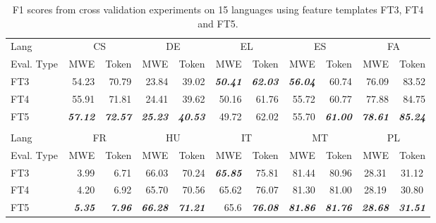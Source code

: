 \documentclass[output=paper,modfonts,nonflat]{langsci/langscibook}
\begin{document}
\begin{table}
\caption{\label{tbl:crf-cv}F1 scores from cross validation experiments on
15 languages using feature templates FT3, FT4 and FT5.}
{
\setlength{\tabcolsep}{0.5pt} %
\small
\begin{tabular}{lrrrrrrrrrr}
\lsptoprule
{Lang} & \multicolumn{2}{c}{{CS}} & \multicolumn{2}{c}{{DE}} & \multicolumn{2}{c}{{EL}} & \multicolumn{2}{c}{{ES}} & \multicolumn{2}{c}{{FA}}\tabularnewline
 
 
{Eval. Type} & {MWE} & {Token} & {MWE} & {Token} & {MWE} & {Token} & {MWE} & {Token} & {MWE} & {Token }\tabularnewline
\midrule
 
{FT3} & {54.23} & {70.79} & {23.84} & {39.02} & \textbf{\emph{50.41}} & \textbf{\emph{62.03}}  & \textbf{\emph{56.04}}  & {60.74} & {76.09} & {83.52 }\tabularnewline
 
{FT4} & {55.91} & {71.81} & {24.41} & {39.62} & {50.16} & {61.76} & {55.72} & {60.77} & {77.88} & {84.75 }\tabularnewline
 
{FT5} & \textbf{\emph{57.12}}  & \textbf{\emph{72.57}}  & \textbf{\emph{25.23}}  & \textbf{\emph{40.53}}  & {49.72} & {62.02} & {55.70} & \textbf{\emph{61.00}}  & \textbf{\emph{78.61}} & \textbf{\emph{85.24}} \tabularnewline
\lspbottomrule
& &&&&&&&&&  \tabularnewline
 
\lsptoprule
{Lang} &  \multicolumn{2}{c}{{FR}} & \multicolumn{2}{c}{{HU}} & \multicolumn{2}{c}{{IT}} & \multicolumn{2}{c}{{MT}} & \multicolumn{2}{c}{{PL}} \tabularnewline
 
 
{Eval. Type} & {MWE} & {Token} & {MWE} & {Token} & {MWE} & {Token} & {MWE} & {Token} & {MWE} & {Token }\tabularnewline
\midrule
 
{FT3} & {3.99} & {6.71} & {66.03} & {70.24} & \textbf{\emph{65.85}} & {75.81} & {81.44} & {80.96} & \multicolumn{1}{c}{{28.31}} & \multicolumn{1}{c}{{31.12}}\tabularnewline
 
{FT4} & {4.20} & {6.92} & {65.70} & {70.56 }& {65.62} & {76.07} & {81.30} & {81.00} & \multicolumn{1}{c}{{28.19}} & \multicolumn{1}{c}{{30.80}}\tabularnewline
 
{FT5} & \textbf{\emph{5.35}}  & \textbf{\emph{7.96}}  & \textbf{\emph{66.28}}  & \textbf{\emph{71.21}} & {65.6} & \textbf{\emph{76.08}} & \textbf{\emph{81.86}}  & \textbf{\emph{81.76}}  & \multicolumn{1}{c}{\textbf{\emph{28.68}}} & \multicolumn{1}{c}{\textbf{\emph{31.51}}}\tabularnewline
 

\end{tabular}}
\end{table}
\end{document}

